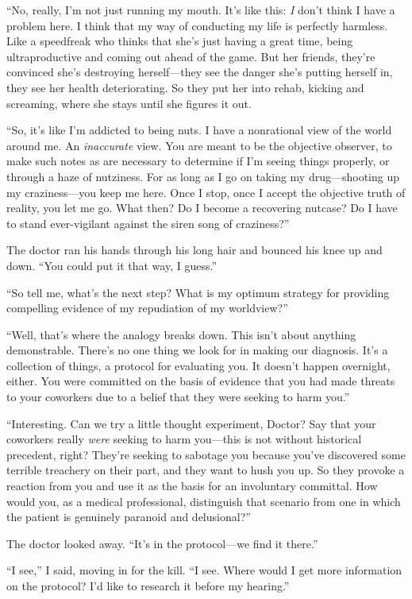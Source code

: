 “No, really, I’m not just running my mouth. It’s like this:
\emph{I} don’t think I have a problem here. I think that my way of
conducting my life is perfectly harmless. Like a speedfreak who
thinks that she’s just having a great time, being ultraproductive
and coming out ahead of the game. But her friends, they’re
convinced she’s destroying herself—they see the danger she’s
putting herself in, they see her health deteriorating. So they put
her into rehab, kicking and screaming, where she stays until she
figures it out.

“So, it’s like I’m addicted to being nuts. I have a nonrational
view of the world around me. An \emph{inaccurate} view. You are
meant to be the objective observer, to make such notes as are
necessary to determine if I’m seeing things properly, or through a
haze of nutziness. For as long as I go on taking my drug—shooting
up my craziness—you keep me here. Once I stop, once I accept the
objective truth of reality, you let me go. What then? Do I become a
recovering nutcase? Do I have to stand ever-vigilant against the
siren song of craziness?”

The doctor ran his hands through his long hair and bounced his knee
up and down. “You could put it that way, I guess.”

“So tell me, what’s the next step? What is my optimum strategy for
providing compelling evidence of my repudiation of my worldview?”

“Well, that’s where the analogy breaks down. This isn’t about
anything demonstrable. There’s no one thing we look for in making
our diagnosis. It’s a collection of things, a protocol for
evaluating you. It doesn’t happen overnight, either. You were
committed on the basis of evidence that you had made threats to
your coworkers due to a belief that they were seeking to harm
you.”

“Interesting. Can we try a little thought experiment, Doctor? Say
that your coworkers really \emph{were} seeking to harm you—this is
not without historical precedent, right? They’re seeking to
sabotage you because you’ve discovered some terrible treachery on
their part, and they want to hush you up. So they provoke a
reaction from you and use it as the basis for an involuntary
committal. How would you, as a medical professional, distinguish
that scenario from one in which the patient is genuinely paranoid
and delusional?”

The doctor looked away. “It’s in the protocol—we find it there.”

“I see,” I said, moving in for the kill. “I see. Where would I get
more information on the protocol? I’d like to research it before my
hearing.”


